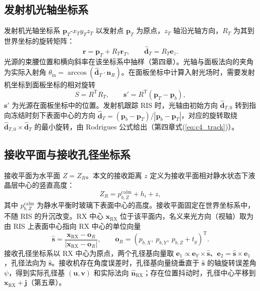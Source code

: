 \subsection{发射机光轴坐标系}

发射机光轴坐标系 $\mathbf p_T$-$x_Ty_Tz_T$ 以发射点 $\mathbf p_T$ 为原点，$z_T$ 轴沿光轴方向，$R_T$ 为其到世界坐标的旋转矩阵：
\begin{equation}
\mathbf r=\mathbf p_T+R_T\mathbf r_T,\qquad \hat{\mathbf d}_T=R_T\mathbf e_z.
\label{eq:c2_tx}
\end{equation}
光源的束腰位置和横向斜率在该坐标系中抽样（第四章）。光轴与面板法向的夹角为实际入射角 $\theta_{\mathrm{in}}=\arccos(\hat{\mathbf d}_T\cdot\mathbf n_R)$。在面板坐标中计算入射光场时，需要发射机坐标到面板坐标的相对旋转
\begin{equation}
S=R^{\mathrm T}R_T,\qquad \mathbf s'=R^{\mathrm T}(\mathbf p_T-\mathbf p_b),
\label{eq:c2_relative}
\end{equation}
$\mathbf s'$ 为光源在面板坐标中的位置。发射机跟踪 RIS 时，光轴由初始方向 $\hat{\mathbf d}_{T,0}$ 转到指向冻结时刻下表面中心的方向 $\hat{\mathbf d}_T=(\mathbf p_b-\mathbf p_T)/|\mathbf p_b-\mathbf p_T|$，对应的旋转取绕 $\hat{\mathbf d}_{T,0}\times\hat{\mathbf d}_T$ 的最小旋转，由 Rodrigues 公式给出（第四章式(\ref{eq:c4_track})）。

\subsection{接收平面与接收孔径坐标系}

接收平面为水平面 $Z=Z_R$。本文的接收距离 $z$ 定义为接收平面相对静水状态下液晶层中心的竖直高度：
\begin{equation}
Z_R=p^{\mathrm{calm}}_{b,Z}+h_i+z,
\label{eq:c2_zr}
\end{equation}
其中 $p^{\mathrm{calm}}_{b,Z}$ 为静水平衡时玻璃下表面中心的高度。接收平面固定在世界坐标系中，不随 RIS 的升沉改变。RX 中心 $\mathbf x_{\mathrm{RX}}$ 位于该平面内，名义来光方向（视轴）取为由 RIS 上表面中心指向 RX 中心的单位向量
\begin{equation}
\hat{\mathbf s}=\frac{\mathbf x_{\mathrm{RX}}-\mathbf o_R}{|\mathbf x_{\mathrm{RX}}-\mathbf o_R|},\qquad
\mathbf o_R=(p_{b,X},\ p_{b,Y},\ p_{b,Z}+t_g)^{\mathrm T}.
\label{eq:c2_boresight}
\end{equation}
接收孔径坐标系以 RX 中心为原点，两个孔径基向量取 $\mathbf e_1\propto\mathbf e_Y\times\hat{\mathbf s}$、$\mathbf e_2=\hat{\mathbf s}\times\mathbf e_1$，孔径法向为 $\hat{\mathbf s}$。接收机存在角度误差时，孔径基向量绕垂直于 $\hat{\mathbf s}$ 的轴旋转误差角 $\psi$，得到实际孔径基 $(\mathbf u,\mathbf v)$ 和实际法向 $\hat{\mathbf n}_{\mathrm{RX}}$；存在位置抖动时，孔径中心平移到 $\mathbf x_{\mathrm{RX}}+\mathbf j$（第五章）。

